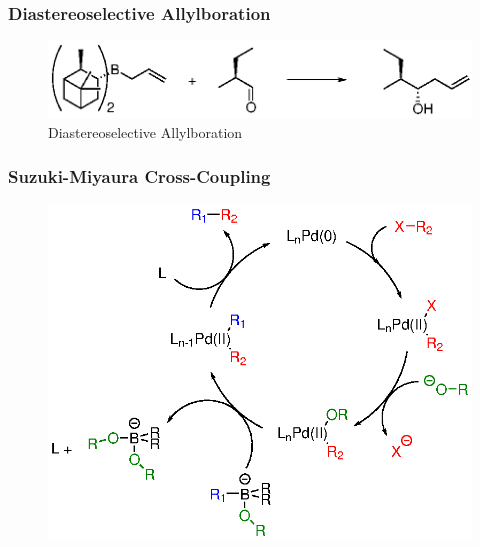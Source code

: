 \begin{frame}
\frametitle{Diastereoselective Allylboration}
\begin{figure}
	\centering
	\includegraphics[width=0.8\linewidth]{fig/diastereo}
	\caption{Diastereoselective Allylboration}
	\label{fig:diastereo}
\end{figure}

\end{frame}

\begin{frame}
	\frametitle{Suzuki-Miyaura Cross-Coupling}
	\begin{figure}
		\centering
		\includegraphics[width=0.7\linewidth]{fig/suzuki-miyaura}
		\label{fig:suzuki-miyaura}
	\end{figure}
	
\end{frame}